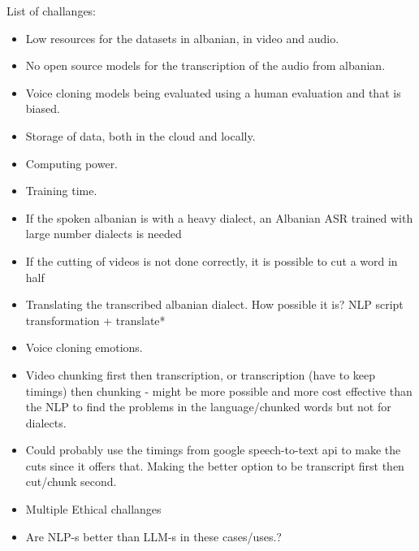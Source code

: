 \documentclass[12pt]{article}
\begin{document}
List of challanges:
\begin{itemize}
    \item Low resources for the datasets in albanian, in video and audio.
    \item No open source models for the transcription of the audio from albanian.
    \item Voice cloning models being evaluated using a human evaluation and that is biased.
    \item Storage of data, both in the cloud and locally.
    \item Computing power.
    \item Training time.
    \item If the spoken albanian is with a heavy dialect, an Albanian ASR trained with large number dialects is needed
    \item If the cutting of videos is not done correctly, it is possible to cut a word in half
    \item Translating the transcribed albanian dialect. How possible it is? NLP script transformation + translate*
    \item Voice cloning emotions.
    \item Video chunking first then transcription, or transcription (have to keep timings) then chunking - might be more possible and more cost effective than the NLP to find the problems in the language/chunked words but not for dialects.
    \item Could probably use the timings from google speech-to-text api to make the cuts since it offers that. Making the better option to be transcript first then cut/chunk second.  
    \item Multiple Ethical challanges
    \item Are NLP-s better than LLM-s in these cases/uses.?
\end{itemize}
\end{document}
